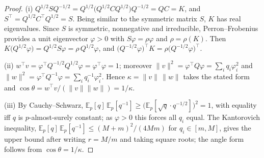 \documentclass[10pt,a4paper]{amsart}
\begin{document}
\begin{proof}
\textup{(i)} $Q^{1/2}SQ^{-1/2}=Q^{1/2}\bigl(Q^{1/2}CQ^{1/2}\bigr)Q^{-1/2}=QC=K$, and $S^{\top}=Q^{1/2}C^{\top}Q^{1/2}=S$. Being similar to the symmetric matrix $S$, $K$ has real eigenvalues. Since $S$ is symmetric, nonnegative and irreducible, Perron--Frobenius provides a unit eigenvector $\varphi>0$ with $S\varphi=\rho\varphi$ and $\rho=\rho(K)$. Then $K\bigl(Q^{1/2}\varphi\bigr)=Q^{1/2}S\varphi=\rho\,Q^{1/2}\varphi$, and $\bigl(Q^{-1/2}\varphi\bigr)^{\top}K=\rho\bigl(Q^{-1/2}\varphi\bigr)^{\top}$.

\textup{(ii)} $w^{\top}v=\varphi^{\top}Q^{-1/2}Q^{1/2}\varphi=\varphi^{\top}\varphi=1$; moreover $\lVert v\rVert^{2}=\varphi^{\top}Q\varphi=\sum_i q_i\varphi_i^{2}$ and $\lVert w\rVert^{2}=\varphi^{\top}Q^{-1}\varphi=\sum_i q_i^{-1}\varphi_i^{2}$. Hence $\kappa=\lVert v\rVert\,\lVert w\rVert$ takes the stated form and $\cos\theta=w^{\top}v/(\lVert v\rVert\lVert w\rVert)=1/\kappa$.

\textup{(iii)} By Cauchy--Schwarz, $\mathbb{E}_p[q]\,\mathbb{E}_p[q^{-1}]\ge\bigl(\mathbb{E}_p[\sqrt q\cdot q^{-1/2}]\bigr)^{2}=1$, with equality iff $q$ is $p$-almost-surely constant; as $\varphi>0$ this forces all $q_i$ equal. The Kantorovich inequality, $\mathbb{E}_p[q]\,\mathbb{E}_p[q^{-1}]\le (M+m)^{2}/(4Mm)$ for $q_i\in[m,M]$, gives the upper bound after writing $r=M/m$ and taking square roots; the angle form follows from $\cos\theta=1/\kappa$.
\end{proof}
\end{document}
